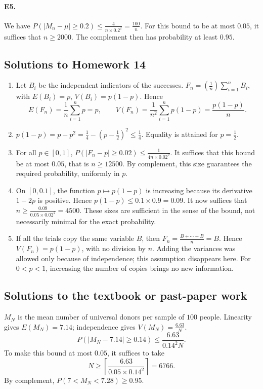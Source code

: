 \paragraph{E5.}We have $P(|M_n-\mu|\ge0.2)\le\frac{4}{n\times0.2^2}=\frac{100}{n}$. For this bound to be at most $0.05$, it suffices that $n\ge2000$. The complement then has probability at least $0.95$.

\subsection{Solutions to Homework 14}\begin{enumerate}
\item Let $B_i$ be the independent indicators of the successes. $F_n=(\frac{1}{n})\sum_{i=1}^nB_i$, with $E(B_i)=p$, $V(B_i)=p(1-p)$. Hence
\[E(F_n)=\frac1n\sum_{i=1}^n p=p,\qquad V(F_n)=\frac1{n^2}\sum_{i=1}^np(1-p)=\frac{p(1-p)}n.\]
\item $p(1-p)=p-p^2=\frac{1}{4}-(p-\frac{1}{2})^2\le\frac{1}{4}$. Equality is attained for $p=\frac{1}{2}$.
\item For all $p\in[0,1]$, $P(|F_n-p|\ge0.02)\le\frac{1}{4n\times0.02^2}$. It suffices that this bound be at most $0.05$, that is $n\ge12500$. By complement, this size guarantees the required probability, uniformly in $p$.
\item On $[0,0.1]$, the function $p\mapsto p(1-p)$ is increasing because its derivative $1-2p$ is positive. Hence $p(1-p)\le0.1\times0.9=0.09$. It now suffices that $n\ge\frac{0.09}{0.05\times0.02^2}=4500$. These sizes are sufficient in the sense of the bound, not necessarily minimal for the exact probability.
\item If all the trials copy the same variable $B$, then $F_n=\frac{B+\cdots+B}{n}=B$. Hence $V(F_n)=p(1-p)$, with no division by $n$. Adding the variances was allowed only because of independence; this assumption disappears here. For $0<p<1$, increasing the number of copies brings no new information.
\end{enumerate}

\subsection{Solutions to the textbook or past-paper work}$M_N$ is the mean number of universal donors per sample of $100$ people. Linearity gives $E(M_N)=7.14$; independence gives $V(M_N)=\frac{6.63}N$.
\[P(|M_N-7.14|\ge0.14)\le\frac{6.63}{0.14^2N}.\]
To make this bound at most $0.05$, it suffices to take
\[N\ge\left\lceil\frac{6.63}{0.05\times0.14^2}\right\rceil=6766.\]
By complement, $P(7<M_N<7.28)\ge0.95$.

\fi

